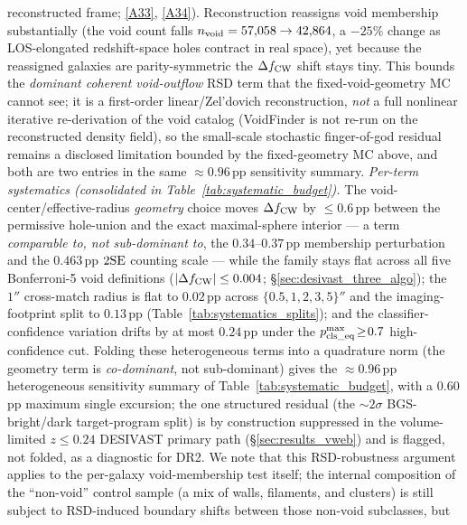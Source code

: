 \documentclass[aps,prd,twocolumn,superscriptaddress,showpacs,preprintnumbers,nofootinbib,longbibliography,floatfix]{revtex4-2}
\newcommand{\repoBase}{https://github.com/Hubify-Projects/bigbounce/blob/main}
\begin{document}
reconstructed frame;
\href{\repoBase/pipelines/p5\_desi\_chirality/outputs/27\_rsd\_void\_recon\_bound.json}{[A33]},
\href{\repoBase/pipelines/p5\_desi\_chirality/scripts/27\_rsd\_void\_recon\_bound.py}{[A34]}).
Reconstruction reassigns void membership substantially (the void count
falls $n_{\rm void}=57{,}058\to42{,}864$, a ${-}25\%$ change as
LOS-elongated redshift-space holes contract in real space), yet because
the reassigned galaxies are parity-symmetric the $\Delta f_{\rm CW}$
shift stays tiny.
This bounds the \emph{dominant coherent void-outflow} RSD term that the
fixed-void-geometry MC cannot see; it is a first-order linear/Zel'dovich
reconstruction, \emph{not} a full nonlinear iterative re-derivation of
the void catalog (VoidFinder is not re-run on the reconstructed density
field), so the small-scale stochastic finger-of-god residual remains a
disclosed limitation bounded by the fixed-geometry MC above, and both
are two entries in the same ${\approx}0.96$\,pp sensitivity summary.
\emph{Per-term systematics (consolidated in
Table~\ref{tab:systematic_budget}).} The void-center/effective-radius
\emph{geometry} choice moves $\Delta f_{\rm CW}$ by $\le 0.6$\,pp between
the permissive hole-union and the exact maximal-sphere interior --- a
term \emph{comparable to, not sub-dominant to}, the
$0.34$--$0.37$\,pp membership perturbation and the $0.463$\,pp $2{\rm SE}$ counting scale
--- while the family stays flat across all five Bonferroni-5 void
definitions ($|\Delta f_{\rm CW}| \le 0.004$;
\S\ref{sec:desivast_three_algo}); the $1''$ cross-match radius is flat to
$0.02$\,pp across $\{0.5,1,2,3,5\}''$ and the imaging-footprint split to
$0.13$\,pp (Table~\ref{tab:systematics_splits}); and the
classifier-confidence variation drifts by at most $0.24$\,pp under the
$p_{\rm cls\_eq}^{\max}\!\ge\!0.7$ high-confidence cut. Folding these
heterogeneous terms into a quadrature norm (the geometry term is
\emph{co-dominant}, not sub-dominant) gives the ${\approx}0.96$\,pp
heterogeneous sensitivity summary of Table~\ref{tab:systematic_budget}, with a
$0.60$\,pp maximum single excursion; the one
structured residual (the ${\sim}2\sigma$ BGS-bright/dark target-program
split) is by construction suppressed in the volume-limited $z\!\le\!0.24$
DESIVAST primary path (\S\ref{sec:results_vweb}) and is flagged, not folded,
as a diagnostic for DR2. We note that
this RSD-robustness argument applies to the per-galaxy void-membership
test itself; the internal composition of the ``non-void'' control
sample (a mix of walls, filaments, and clusters) is still subject to
RSD-induced boundary shifts between those non-void subclasses, but
\end{document}
